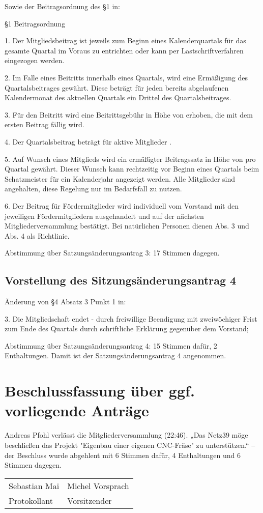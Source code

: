 \documentclass[a4paper,12pt,titlepage]{scrartcl}
\begin{document}
Sowie der Beitragsordnung des §1 in: 
\begin{displayquote}
§1 Beitragsordnung

1. Der Mitgliedsbeitrag ist jeweils zum Beginn eines Kalenderquartals für das gesamte Quartal im Voraus zu entrichten oder kann per Lastschriftverfahren eingezogen werden.

2. Im Falle eines Beitritts innerhalb eines Quartals, wird eine Ermäßigung des Quartalsbeitrages gewährt. Diese beträgt für jeden bereits abgelaufenen Kalendermonat des aktuellen Quartals ein Drittel des Quartalsbeitrages.

3. Für den Beitritt wird eine Beitrittsgebühr in Höhe von  erhoben, die mit dem ersten Beitrag fällig wird.

4. Der Quartalsbeitrag beträgt für aktive Mitglieder .

5. Auf Wunsch eines Mitglieds wird ein ermäßigter Beitragssatz in Höhe von  pro Quartal gewährt. Dieser Wunsch kann rechtzeitig vor Beginn eines Quartals beim Schatzmeister für ein Kalenderjahr angezeigt werden. Alle Mitglieder sind angehalten, diese Regelung nur im Bedarfsfall zu nutzen.

6. Der Beitrag für Fördermitglieder wird individuell vom Vorstand mit den jeweiligen Fördermitgliedern ausgehandelt und auf der nächsten Mitgliederversammlung bestätigt. Bei natürlichen Personen dienen Abs. 3 und Abs. 4 als Richtlinie.
\end{displayquote}

Abstimmung über Satzungsänderungsantrag 3: 17 Stimmen dagegen.

\subsection{Vorstellung des Sitzungsänderungsantrag 4}
Änderung von §4  Absatz 3 Punkt 1 in:
\begin{displayquote}
3. Die Mitgliedschaft endet - durch freiwillige Beendigung mit zweiwöchiger Frist zum Ende des Quartals durch schriftliche Erklärung gegenüber dem Vorstand;
\end{displayquote}

Abstimmung über Satzungsänderungsantrag 4: 15 Stimmen dafür, 2 Enthaltungen. Damit ist der Satzungsänderungsantrag 4 angenommen.

\section{Beschlussfassung über ggf. vorliegende Anträge}

Andreas Pfohl verlässt die Mitgliederversammlung (22:46).
„Das Netz39 möge beschließen das Projekt "Eigenbau einer eigenen CNC-Fräse" zu unterstützen.“ – der Beschluss wurde abgehlent mit 6 Stimmen dafür, 4 Enthaltungen und 6 Stimmen dagegen.

\nopagebreak
\vspace{10\baselineskip}
\begin{tabularx}{\textwidth}[b]{X X}
	\hline
	Sebastian Mai & Michel Vorsprach \\
	Protokollant & Vorsitzender
\end{tabularx}

\appendix

\end{document}
